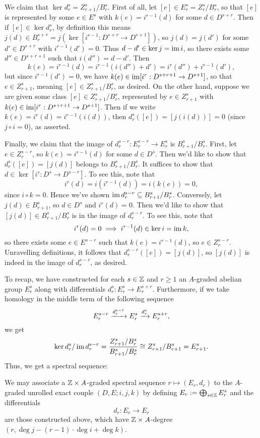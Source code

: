 \documentclass[../main.tex]{subfiles}
\begin{document}
We claim that $\ker d_r^s=Z^s_{r+1}/B^s_r$. First of all, let $[e]\in E_r^s=Z_r^s/B_r^s$, so that $[e]$ is represented by some $e\in E^s$ with $k(e)=i^{r-1}(d)$ for some $d\in D^{s+r}$. Then if $[e]\in\ker d_r^s$, by definition this means $j(d)\in B_r^{s+r}=j(\ker[i^{r-1}:D^{s+r}\to D^{s+1}])$, so $j(d)=j(d')$ for some $d'\in D^{s+r}$ with $i^{r-1}(d')=0$. Thus $d-d'\in\ker j=\operatorname{im} i$, so there exists some $d''\in D^{s+r+1}$ such that $i(d'')=d-d'$. Then
\[k(e)=i^{r-1}(d)=i^{r-1}(i(d'')+d')=i^r(d'')+i^{r-1}(d'),\]
but since $i^{r-1}(d')=0$, we have $k(e)\in\operatorname{im}[i^r:D^{s+r+1}\to D^{s+1}]$, so that $e\in Z^s_{r+1}$, meaning $[e]\in Z^s_{r+1}/B^s_r$, as desired. On the other hand, suppose we are given some class $[e]\in Z^s_{r+1}/B^s_r$, represented by $e\in Z^s_{r+1}$ with $k(e)\in\operatorname{im}[i^r:D^{s+r+1}\to D^{s+1}]$. Then if we write $k(e)=i^r(d)=i^{r-1}(i(d))$, then $d_r^s([e])=[j(i(d))]=0$ (since $j\circ i=0$), as asserted.

Finally, we claim that the image of $d_r^{s-r}:E^{s-r}_r\to E^s_r$ is $B^s_{r+1}/B^s_r$. First, let $e\in Z^{s-r}_r$, so $k(e)=i^{r-1}(d)$ for some $d\in D^{s}$. Then we'd like to show that $d_r^s([e])=[j(d)]$ belongs to $B^s_{r+1}/B^s_r$. It suffices to show that $d\in \ker[i^r:D^s\to D^{s-r}]$. To see this, note that 
\[i^r(d)=i(i^{r-1}(d))=i(k(e))=0,\]
since $i\circ k=0$. Hence we've shown $\operatorname{im} d_r^{s-r}\subseteq B^s_{r+1}/B^s_r$. Conversely, let $j(d)\in B^s_{r+1}$, so $d\in D^s$ and $i^{r}(d)=0$. Then we'd like to show that $[j(d)]\in B^s_{r+1}/B^s_r$ is in the image of $d_r^{s-r}$. To see this, note that
\[i^r(d)=0\implies i^{r-1}(d)\in\ker i=\operatorname{im} k,\]
so there exists some $e\in E^{s-r}$ such that $k(e)=i^{r-1}(d)$, so $e\in Z^{s-r}_r$. Unravelling definitions, it follows that $d_r^{s-r}([e])=[j(d)]$, so $[j(d)]$ is indeed in the image of $d_r^{s-r}$, as desired.

To recap, we have constructed for each $s\in\mathbb{Z}$ and $r\geq1$ an $A$-graded abelian group $E_r^s$ along with differentials $d_r^s:E_r^s\to E_r^{s+r}$. Furthermore, if we take homology in the middle term of the following sequence
\[E_r^{s-r}\xrightarrow{d_r^{s-r}}E_r^s\xrightarrow{d_r^s}E^{s+r}_r,\]
we get
\[\ker d_r^s/\operatorname{im} d_r^{s-r}=\frac{Z_{r+1}^s/B_r^s}{B_{r+1}^s/B_r^s}\cong Z_{r+1}^s/B_{r+1}^s=E_{r+1}^s.\]
Thus, we get a spectral sequence:

\begin{definition}\label{SSeq_assoc_to_unrolled_EC}
    We may associate a $\mathbb{Z}\times A$-graded spectral sequence $r\mapsto(E_r,d_r)$ to the $A$-graded unrolled exact couple $(D,E;i,j,k)$ by defining $E_r:=\bigoplus_{s\in\mathbb{Z}}E_r^s$ and the differentials 
    \[d_r:E_r\to E_r\]
    are those constructed above, which have $\mathbb{Z}\times A$-degree $(r,\deg j-(r-1)\cdot\deg i+\deg k)$.
\end{definition}
\end{document}
